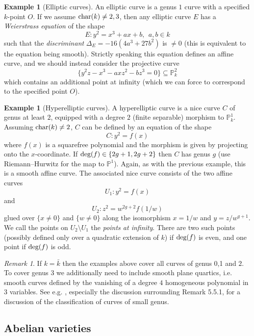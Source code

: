 \documentclass[12pt]{amsart}
\numberwithin{equation}{section}
\theoremstyle{remark}
\newtheorem{remark}[equation]{Remark}
\theoremstyle{definition}
\newtheorem{example}[equation]{Example}
\theoremstyle{definition}
\theoremstyle{definition}
\theoremstyle{definition}
\theoremstyle{definition}
\theoremstyle{definition}
\begin{document}
\begin{example}[Elliptic curves]
An elliptic curve is a genus $1$ curve with a specified $k$-point $O$. If we assume $\textup{char}(k)\neq 2,3$, then any elliptic curve $E$ has a \textit{Weierstrass equation} of the shape
\[E:y^2=x^3+ax+b,~~a,b\in k\]
 such that the \textit{discriminant} $\Delta_E=-16(4a^3+27b^2)$ is $\neq 0$ (this is equivalent to the equation being smooth). Strictly speaking this equation defines an affine curve, and we should instead consider the projective curve
\[\{y^2z-x^3-axz^2-bz^3=0\}\subseteq \mathbb{P}^2_k\]
which contains an additional point at infinity (which we can force to correspond to the specified point $O$).
\end{example}

\begin{example}[Hyperelliptic curves]
A hyperelliptic curve is a nice curve $C$ of genus at least $2$, equipped with a degree $2$ (finite separable) morphism to $\mathbb{P}^1_k$. Assuming $\textup{char}(k)\neq 2$, $C$ can be defined by an equation of the shape
\[C:y^2=f(x)\]
where $f(x)$ is a squarefree polynomial and the morphism is given by projecting onto the $x$-coordinate. If $\textup{deg}(f)\in \{2g+1,2g+2\}$ then $C$ has genus $g$ (use Riemann--Hurwitz for the map to $\mathbb{P}^1$). Again, as with the previous example, this is a smooth affine curve. The associated nice curve consists of the two affine curves
\[U_1: y^2=f(x)\]
and
\[U_2: z^2=w^{2g+2}f(1/w)\]
glued over $\{x\neq 0\}$ and $\{w\neq 0\}$ along the isomorphism $x=1/w$ and $y=z/w^{g+1}$. We call the points on $U_2\setminus U_1$ the \textit{points at infinity}. There are two such points (possibly defined only over a quadratic extension of $k$) if $\textup{deg}(f)$ is even, and one point if $\textup{deg}(f)$ is odd. 
\end{example}

\begin{remark}
If $k=\bar{k}$ then the examples above cover all curves of genus 0,1 and $2$. To cover genus $3$ we additionally need to include smooth plane quartics, i.e. smooth curves defined by the vanishing of a degree $4$ homogeneous polynomial in $3$ variables. See e.g. \cite[Chapter IV]{MR0463157}, especially the discussion surrounding Remark 5.5.1, for a discussion of the classification of curves of small genus.
\end{remark}

\subsection{Abelian varieties} 
\end{document}
